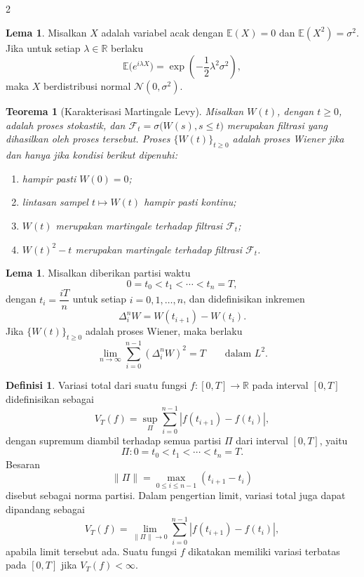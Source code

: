 \documentclass[a4paper,extrafontsizes, 9pt]{memoir}
\theoremstyle{definition}
\newtheorem{definisi}[kalstok]{Definisi}
\newtheorem{lemma}[kalstok]{Lema}
\theoremstyle{plain}
\newtheorem{teorema}[kalstok]{Teorema}
\theoremstyle{remark}
\begin{document}
\begin{multicols}{2}
  \begin{lemma}
    Misalkan $X$ adalah variabel acak dengan $\mathbb{E}(X)=0$ dan
    $\mathbb{E}(X^2)=\sigma^2$. Jika untuk setiap $\lambda\in\mathbb{R}$ berlaku
    \[\mathbb{E}\bigl(e^{i\lambda X}\bigr)=\exp\!\left(-\frac{1}{2}\lambda^2\sigma^2\right),\]
    maka $X$ berdistribusi normal $\mathcal{N}(0,\sigma^2)$.
  \end{lemma}

  \begin{teorema}[Karakterisasi Martingale Levy]
    Misalkan $W(t)$, dengan $t\ge 0$, adalah proses stokastik, dan
    $\mathcal{F}_t=\sigma\bigl(W(s),s\le t\bigr)$ merupakan filtrasi yang dihasilkan oleh proses
    tersebut. Proses $\{W(t)\}_{t\ge 0}$ adalah proses Wiener jika dan hanya jika kondisi berikut
    dipenuhi:
    \begin{enumerate}[leftmargin=*, itemsep=0.5mm]
      \item hampir pasti $W(0)=0$;
      \item lintasan sampel $t\mapsto W(t)$ hampir pasti kontinu;
      \item $W(t)$ merupakan martingale terhadap filtrasi $\mathcal{F}_t$;
      \item $W(t)^2-t$ merupakan martingale terhadap filtrasi $\mathcal{F}_t$.
    \end{enumerate}
  \end{teorema}

  \begin{lemma}
    Misalkan diberikan partisi waktu
    \[0=t_0<t_1<\cdots<t_n=T,\]
    dengan $t_i=\dfrac{iT}{n}$ untuk setiap $i=0,1,\ldots,n$, dan didefinisikan inkremen
    \[\Delta_i^n W=W(t_{i+1})-W(t_i).\]
    Jika $\{W(t)\}_{t\ge 0}$ adalah proses Wiener, maka berlaku
    \[\lim_{n\to\infty}\sum_{i=0}^{n-1}(\Delta_i^n W)^2=T
      \qquad \text{dalam }L^2.\]
  \end{lemma}

  \begin{definisi}
    Variasi total dari suatu fungsi $f:[0,T]\to\mathbb{R}$ pada interval $[0,T]$ didefinisikan
    sebagai
    \[V_T(f)=\sup_{\Pi}\sum_{i=0}^{n-1}|f(t_{i+1})-f(t_i)|,\]
    dengan supremum diambil terhadap semua partisi $\Pi$ dari interval $[0,T]$, yaitu
    \[\Pi:0=t_0<t_1<\cdots<t_n=T.\]
    Besaran
    \[\|\Pi\|=\max_{0\le i\le n-1}(t_{i+1}-t_i)\]
    disebut sebagai norma partisi. Dalam pengertian limit, variasi total juga dapat dipandang
    sebagai
    \[V_T(f)=\lim_{\|\Pi\|\to 0}\sum_{i=0}^{n-1}|f(t_{i+1})-f(t_i)|,\]
    apabila limit tersebut ada. Suatu fungsi $f$ dikatakan memiliki variasi terbatas pada
    $[0,T]$ jika $V_T(f)<\infty$.
  \end{definisi}


\end{multicols}
\end{document}
